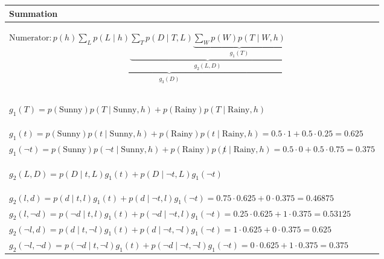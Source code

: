 \begin{example}
\begin{enumerate}
\begin{enumerate}
        \end{enumerate}
        \begin{center}
            \begin{tabular}{l}
                \toprule
                \textbf{Summation} \\
                \toprule
                \multicolumn{1}{p{\linewidth}}{
                \begin{center}
                    $\text{Numerator}: \underbrace{p(h) \sum_L p(L \mid h) \underbrace{\sum_T p(D \mid T,L) \underbrace{\sum_W p(W) p(T \mid W,h)}_{g_1(T)}}_{g_2(L,D)}}_{g_3(D)}$
                \end{center}} \\
                \toprule
                \multicolumn{1}{p{\linewidth}}{
                \begin{center}
                    $g_1(T) = p(\text{Sunny}) p(T \mid \text{Sunny},h) + p(\text{Rainy}) p(T \mid \text{Rainy},h)$
                \end{center}} \\
                $g_1(t) = p(\text{Sunny}) p(t \mid \text{Sunny},h) + p(\text{Rainy}) p(t \mid \text{Rainy},h) = 0.5 \cdot 1 + 0.5 \cdot 0.25 = 0.625$ \\
                $g_1(\lnot t) =  p(\text{Sunny}) p(\lnot t \mid \text{Sunny},h) + p(\text{Rainy}) p(\not t \mid \text{Rainy},h) = 0.5 \cdot 0 + 0.5 \cdot 0.75 = 0.375$ \\
                \midrule
                \multicolumn{1}{p{\linewidth}}{
                \begin{center}
                    $g_2(L,D) = p(D \mid t,L) g_1(t) + p(D \mid \lnot t, L) g_1(\lnot t)$ 
                \end{center}} \\
                $g_2(l,d) = p(d \mid t,l) g_1(t) + p(d \mid \lnot t, l) g_1(\lnot t) = 0.75 \cdot 0.625 + 0 \cdot 0.375 = 0.46875$ \\
                $g_2(l,\lnot d) = p(\lnot d \mid t,l) g_1(t) + p(\lnot d \mid \lnot t, l) g_1(\lnot t) = 0.25 \cdot 0.625 + 1 \cdot 0.375 = 0.53125$ \\
                $g_2(\lnot l,d) = p(d \mid t,\lnot l) g_1(t) + p(d \mid \lnot t, \lnot l) g_1(\lnot t) = 1 \cdot 0.625 + 0 \cdot 0.375 = 0.625$ \\
                $g_2(\lnot l,\lnot d) = p(\lnot d \mid t,\lnot l) g_1(t) + p(\lnot d \mid \lnot t, \lnot l) g_1(\lnot t) = 0 \cdot 0.625 + 1 \cdot 0.375 = 0.375$ \\

\end{tabular}
\end{center}
\end{enumerate}
\end{example}
